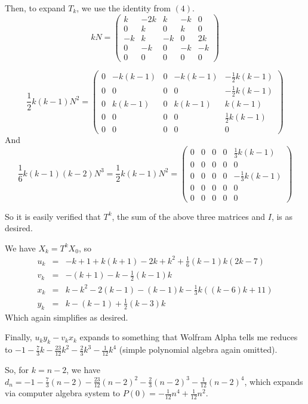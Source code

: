 \documentclass{article}
\begin{document}
Then, to expand $T_k$, we use the identity from $(4)$.
\[
kN = \left( 
\begin{array}{ccccc}
k & -2k & k & -k & 0 \\
0 &   k & 0 &  k & 0 \\
-k&   k & -k&  0 & 2k \\
0 &  -k & 0 & -k & -k \\
0 & 0 & 0 & 0 & 0
\end{array}
\right)
\]

\[
\frac{1}{2}k(k-1)N^2 = \left( 
\begin{array}{ccccc}
  0 & -k(k-1) & 0 & -k(k-1) & -\frac{1}{2}k(k-1) \\
  0 &   0 & 0 &  0 & -\frac{1}{2}k(k-1) \\
0 &  k(k-1) & 0 & k(k-1) & k(k-1) \\
0 &   0 & 0 &  0 &  \frac{1}{2}k(k-1)  \\
0 & 0 & 0 & 0 & 0
\end{array}
\right)
\]
And 
\[
\frac{1}{6}k(k-1)(k-2)N^3 = 
\frac{1}{2}k(k-1)N^2 = \left( 
\begin{array}{ccccc}
0 & 0 & 0 & 0 & \frac{1}{3}k(k-1) \\
0 & 0 & 0 & 0 & 0 \\
0 & 0 & 0 & 0 & -\frac{1}{3}k(k-1)  \\
0 & 0 & 0 & 0 & 0  \\
0 & 0 & 0 & 0 & 0
\end{array}
\right)
\]

So it is easily verified that 
$T^k$, the sum of the above three matrices and $I$, is as desired.

We have $X_k = T^k X_0$, so 
\begin{eqnarray*}
  u_k &=& -k+1 +k(k+1) - 2k + k^2 + \frac{1}{6}(k-1)k(2k-7)\\
  v_k &=&  -(k+1) -k - \frac{1}{2}(k-1)k\\
  x_k &=& k - k^2 -2(k-1) - (k-1)k - \frac{1}{3}k(( k-6)k + 11)\\
  y_k &=&  k - (k-1) + \frac{1}{2}(k-3)k
\end{eqnarray*}
Which again simplifies as desired.

Finally, $u_k y_k - v_k x_k$ expands to something that Wolfram Alpha tells me reduces to $-1 - \frac{7}{3}k - \frac{23}{12}k^2 - \frac{2}{3}k^3 - \frac{1}{12}k^4$ (simple polynomial algebra again omitted).

So, for $k = n -2$, we have $d_n = -1 - \frac{7}{3}(n-2) - \frac{23}{12}(n-2)^2 - \frac{2}{3}(n-2)^3 - \frac{1}{12}(n-2)^4$, which expands via computer algebra system to $P(0) = -\frac{1}{12}n^4 + \frac{1}{12} n^2$.
\end{document}
